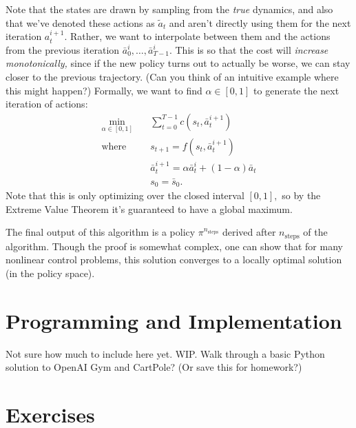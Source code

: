 \documentclass[../main/main]{subfiles}
\begin{document}
Note that the states are drawn by sampling from the \emph{true} dynamics,
and also that we've denoted these actions as $\tilde a_t$ and aren't directly using them for the next iteration $a^{i+1}_t$.
Rather, we want to interpolate between them and the actions from the previous iteration $\bar a^i_0, \dots, \bar a^i_{T-1}.$
This is so that the cost will \emph{increase monotonically,} since if the new policy turns out to actually be worse, we can stay closer to the previous trajectory. (Can you think of an intuitive example where this might happen?)
Formally, we want to find $\alpha \in [0, 1]$ to generate the next iteration of actions: \begin{align*}
    \min_{\alpha \in [0, 1]} \quad & \sum_{t=0}^{T-1} c(s_t, \bar a^{i+1}_t) \\
    \text{where} \quad & s_{t+1} = f(s_t, \bar a^{i+1}_t) \\
    & \bar a^{i+1}_t = \alpha \bar a^i_t + (1-\alpha) \bar a_t \\
    & s_0 = \bar s_0.
\end{align*}
Note that this is only optimizing over the closed interval $[0, 1],$ so by the Extreme Value Theorem it's guaranteed to have a global maximum.

The final output of this algorithm is a policy $\pi^{n_\text{steps}}$ derived after $n_\text{steps}$ of the algorithm.
Though the proof is somewhat complex, one can show that for many nonlinear control problems, this solution converges to a locally optimal solution (in the policy space).


\section{Programming and Implementation}

Not sure how much to include here yet. WIP. Walk through a basic Python solution
to OpenAI Gym and CartPole? (Or save this for homework?)



\section{Exercises}
\end{document}
